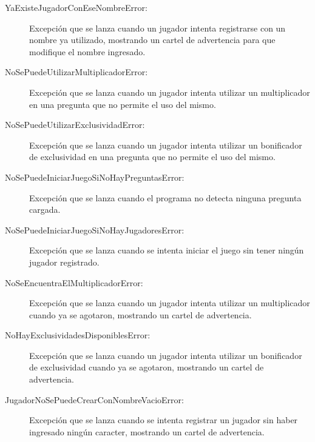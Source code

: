 \documentclass[titlepage,a4paper]{article}
\begin{document}
\begin{description}
\item[YaExisteJugadorConEseNombreError:] Excepción que se lanza cuando un jugador intenta registrarse con un nombre ya utilizado, mostrando un cartel de advertencia para que modifique el nombre ingresado.

\end{description}

\begin{description}
\item[NoSePuedeUtilizarMultiplicadorError:] Excepción que se lanza cuando un jugador intenta utilizar un multiplicador en una pregunta que no permite el uso del mismo.

\end{description}

\begin{description}
\item[NoSePuedeUtilizarExclusividadError:] Excepción que se lanza cuando un jugador intenta utilizar un bonificador de exclusividad en una pregunta que no permite el uso del mismo.

\end{description}

\begin{description}
\item[NoSePuedeIniciarJuegoSiNoHayPreguntasError:] Excepción que se lanza cuando el programa no detecta ninguna pregunta cargada.

\end{description}

\begin{description}
\item[NoSePuedeIniciarJuegoSiNoHayJugadoresError:] Excepción que se lanza cuando se intenta iniciar el juego sin tener ningún jugador registrado.

\end{description}

\begin{description}
\item[NoSeEncuentraElMultiplicadorError:] Excepción que se lanza cuando un jugador intenta utilizar un multiplicador cuando ya se agotaron, mostrando un cartel de advertencia.

\end{description}

\begin{description}
\item[NoHayExclusividadesDisponiblesError:] Excepción que se lanza cuando un jugador intenta utilizar un bonificador de exclusividad cuando ya se agotaron, mostrando un cartel de advertencia.

\end{description}

\begin{description}
\item[JugadorNoSePuedeCrearConNombreVacioError:] Excepción que se lanza cuando se intenta registrar un jugador sin haber ingresado ningún caracter, mostrando un cartel de advertencia.

\end{description}
\end{document}
